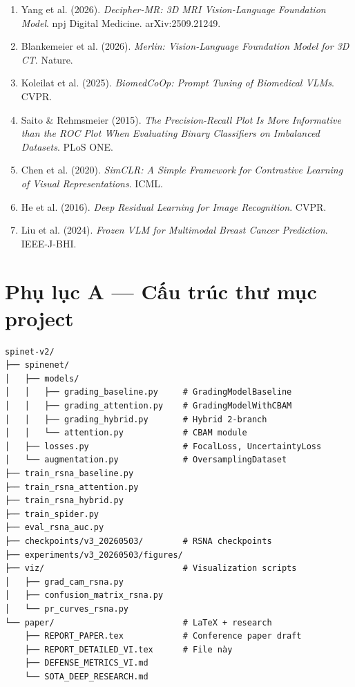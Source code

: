 \documentclass[11pt,a4paper]{article}
\begin{document}
\begin{enumerate}[leftmargin=*]
\item Yang et al. (2026). \textit{Decipher-MR: 3D MRI Vision-Language
Foundation Model}. npj Digital Medicine. arXiv:2509.21249.

\item Blankemeier et al. (2026). \textit{Merlin: Vision-Language
Foundation Model for 3D CT}. Nature.

\item Koleilat et al. (2025). \textit{BiomedCoOp: Prompt Tuning of
Biomedical VLMs}. CVPR.

\item Saito \& Rehmsmeier (2015). \textit{The Precision-Recall Plot
Is More Informative than the ROC Plot When Evaluating Binary
Classifiers on Imbalanced Datasets}. PLoS ONE.

\item Chen et al. (2020). \textit{SimCLR: A Simple Framework for
Contrastive Learning of Visual Representations}. ICML.

\item He et al. (2016). \textit{Deep Residual Learning for Image
Recognition}. CVPR.

\item Liu et al. (2024). \textit{Frozen VLM for Multimodal Breast
Cancer Prediction}. IEEE-J-BHI.
\end{enumerate}

\appendix
\section{Phụ lục A — Cấu trúc thư mục project}

\begin{verbatim}
spinet-v2/
├── spinenet/
│   ├── models/
│   │   ├── grading_baseline.py     # GradingModelBaseline
│   │   ├── grading_attention.py    # GradingModelWithCBAM
│   │   ├── grading_hybrid.py       # Hybrid 2-branch
│   │   └── attention.py            # CBAM module
│   ├── losses.py                   # FocalLoss, UncertaintyLoss
│   └── augmentation.py             # OversamplingDataset
├── train_rsna_baseline.py
├── train_rsna_attention.py
├── train_rsna_hybrid.py
├── train_spider.py
├── eval_rsna_auc.py
├── checkpoints/v3_20260503/        # RSNA checkpoints
├── experiments/v3_20260503/figures/
├── viz/                            # Visualization scripts
│   ├── grad_cam_rsna.py
│   ├── confusion_matrix_rsna.py
│   └── pr_curves_rsna.py
└── paper/                          # LaTeX + research
    ├── REPORT_PAPER.tex            # Conference paper draft
    ├── REPORT_DETAILED_VI.tex      # File này
    ├── DEFENSE_METRICS_VI.md
    └── SOTA_DEEP_RESEARCH.md
\end{verbatim}
\end{document}
